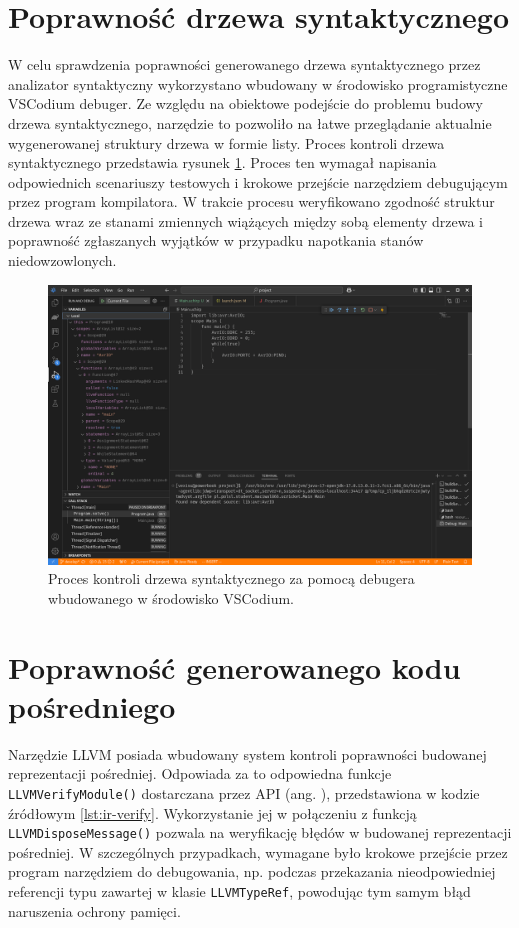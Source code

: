 \section{Poprawność drzewa syntaktycznego}
W celu sprawdzenia poprawności generowanego drzewa syntaktycznego przez analizator syntaktyczny wykorzystano wbudowany w środowisko programistyczne VSCodium debuger. Ze względu na obiektowe podejście do problemu budowy drzewa syntaktycznego, narzędzie to pozwoliło na łatwe przeglądanie aktualnie wygenerowanej struktury drzewa w formie listy. Proces kontroli drzewa syntaktycznego przedstawia rysunek \ref{fig:vscodium-debug-ast}. Proces ten wymagał napisania odpowiednich scenariuszy testowych i krokowe przejście narzędziem debugującym przez program kompilatora. W trakcie procesu weryfikowano zgodność struktur drzewa wraz ze stanami zmiennych wiążących między sobą elementy drzewa i poprawność zgłaszanych wyjątków w przypadku napotkania stanów niedowzowlonych.

\begin{figure}
\centering
	\includegraphics[width=1\textwidth]{graf/vscodium-debug-ast.png}
	\caption{Proces kontroli drzewa syntaktycznego za pomocą debugera wbudowanego w środowisko VSCodium.}
\label{fig:vscodium-debug-ast}
\end{figure}

\section{Poprawność generowanego kodu pośredniego}
Narzędzie LLVM posiada wbudowany system kontroli poprawności budowanej reprezentacji pośredniej. Odpowiada za to odpowiedna funkcje \lstinline|LLVMVerifyModule()| dostarczana przez API (ang. ), przedstawiona w kodzie źródłowym \ref{lst:ir-verify}. Wykorzystanie jej w połączeniu z funkcją \lstinline|LLVMDisposeMessage()| pozwala na weryfikację błędów w budowanej reprezentacji pośredniej. W szczególnych przypadkach, wymagane było krokowe przejście przez program narzędziem do debugowania, np. podczas przekazania nieodpowiedniej referencji typu zawartej w klasie \lstinline|LLVMTypeRef|, powodując tym samym błąd naruszenia ochrony pamięci.

